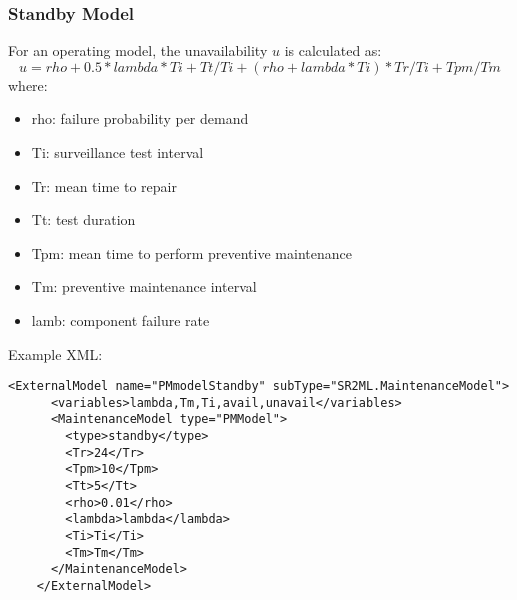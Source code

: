 \subsubsection{Standby Model}
For an operating model, the unavailability $u$ is calculated as: 
\begin{equation}
  u = rho + 0.5*lambda*Ti + Tt/Ti + (rho+lambda*Ti)*Tr/Ti + Tpm/Tm
\end{equation}
where:
\begin{itemize}
  \item rho: failure probability per demand
  \item Ti: surveillance test interval
  \item Tr: mean time to repair
  \item Tt: test duration
  \item Tpm: mean time to perform preventive maintenance
  \item Tm: preventive maintenance interval
  \item lamb: component failure rate
\end{itemize}

Example XML:
\begin{lstlisting}[style=XML]
    <ExternalModel name="PMmodelStandby" subType="SR2ML.MaintenanceModel">
      <variables>lambda,Tm,Ti,avail,unavail</variables>
      <MaintenanceModel type="PMModel">
        <type>standby</type>
        <Tr>24</Tr>
        <Tpm>10</Tpm>
        <Tt>5</Tt>
        <rho>0.01</rho>
        <lambda>lambda</lambda>
        <Ti>Ti</Ti>
        <Tm>Tm</Tm>
      </MaintenanceModel>
    </ExternalModel>
\end{lstlisting}
